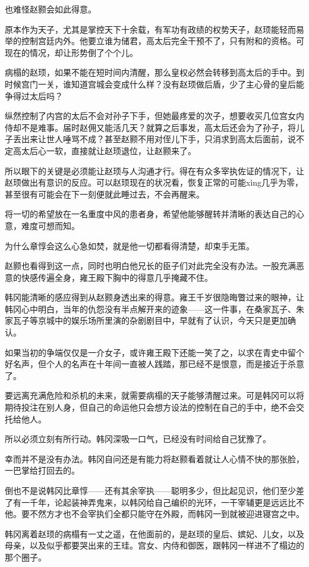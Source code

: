 也难怪赵颢会如此得意。

原本作为天子，尤其是掌控天下十余载，有军功有政绩的权势天子，赵顼能轻而易举的控制宫廷内外。他要立谁为储君，高太后完全干预不了，只有附和的资格。可现在的情况，却让形势倒了个个儿。

病榻的赵顼，如果不能在短时间内清醒，那么皇权必然会转移到高太后的手中。到时候宫门一关，谁知道宫城会变成什么样？没有赵顼做后盾，少了主心骨的皇后能争得过太后吗？

纵然控制了内宫的太后不会对孙子下手，但她最疼爱的次子，想要收买几位宫女内侍却不是难事。届时赵佣又能活几天？就算之后事发，高太后还会为了孙子，将儿子丢出来让世人唾骂不成？甚至赵颢不用对侄儿下手，只消求到高太后面前，说不定高太后心一软，直接就让赵顼退位，让赵颢来了。

所以眼下的关键是必须能让赵顼与人沟通才行。得在有众多宰执佐证的情况下，让赵顼做出有意识的反应。可以赵顼现在的状况看，恢复正常的可能xìng几乎为零，甚至很有可能会在下一刻便就此睡过去，不会再醒来。

将一切的希望放在一名重度中风的患者身，希望他能够醒转并清晰的表达自己的心意，难度可想而知。

为什么章惇会这么心急如焚，就是他一切都看得清楚，却束手无策。

赵颢也看得到这一点，同时也明白他兄长的臣子们对此完全没有办法。一股充满恶意的快感传遍全身，雍王殿下胸中的得意几乎掩藏不住。

韩冈能清晰的感应得到从赵颢身透出来的得意。雍王千岁很隐晦瞥过来的眼神，让韩冈心中明白，当年的仇怨没有半点解开来的迹象——这一件事，在桑家瓦子、朱家瓦子等京城中的娱乐场所里演的杂剧剧目中，早就有了认识，今天只是更加确认。

如果当初的争端仅仅是一介女子，或许雍王殿下还能一笑了之，以求在青史中留个好名声，但个人的名声在十年间一直被人践踏，那已经不是恨意，而是接近于杀意了。

要远离充满危险和杀机的未来，就需要病榻的天子能够清醒过来。可是韩冈可以将期待投注在别人身，但自己的命运他只会想方设法的控制在自己的手中，绝不会交托给他人。

所以必须立刻有所行动。韩冈深吸一口气，已经没有时间给自己犹豫了。

幸而并不是没有办法。韩冈自问还是有能力将赵颢看着就让人心情不快的那张脸，一巴掌给打回去的。

倒也不是说韩冈比章惇——还有其余宰执——聪明多少，但比起见识，他们至少差了有一千年，论起装神弄鬼来，以韩冈给自己编织的光环，一干宰辅更是远远比不他。要不然方才也不会宰执们全都只能守在外殿，而韩冈一到就被迎进寝宫之中。

韩冈离着赵顼的病榻有一丈之遥，在他面前的，是赵顼的皇后、嫔妃、儿女，以及母亲，以及似乎都要哭出来的王珪。宫女、内侍和御医，跟韩冈一样进不了榻边的那个圈子。

